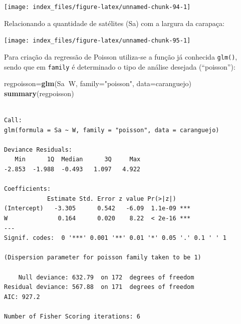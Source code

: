 \documentclass[12pt,brazil,oneside]{book}
\newenvironment{Shaded}{\begin{snugshade}}{\end{snugshade}}
\newcommand{\DataTypeTok}[1]{\textcolor[rgb]{0.13,0.29,0.53}{#1}}
\newcommand{\KeywordTok}[1]{\textcolor[rgb]{0.13,0.29,0.53}{\textbf{#1}}}
\newcommand{\NormalTok}[1]{#1}
\newcommand{\OperatorTok}[1]{\textcolor[rgb]{0.81,0.36,0.00}{\textbf{#1}}}
\newcommand{\StringTok}[1]{\textcolor[rgb]{0.31,0.60,0.02}{#1}}
\begin{document}
\begin{center}\texttt{[image: index\_files/figure-latex/unnamed-chunk-94-1]} \end{center}

Relacionando a quantidade de satélites (Sa) com a largura da carapaça:

\begin{Shaded}
\end{Shaded}

\begin{center}\texttt{[image: index\_files/figure-latex/unnamed-chunk-95-1]} \end{center}

Para criação da regressão de Poisson utiliza-se a função já conhecida \texttt{glm()}, sendo que em \texttt{family} é determinado o tipo de análise desejada (``poisson''):

\begin{Shaded}
\begin{Highlighting}[]
\NormalTok{regpoisson=}\KeywordTok{glm}\NormalTok{(Sa}\OperatorTok{~}\NormalTok{W, }\DataTypeTok{family=}\StringTok{"poisson"}\NormalTok{, }\DataTypeTok{data=}\NormalTok{caranguejo)}
\KeywordTok{summary}\NormalTok{(regpoisson)}
\end{Highlighting}
\end{Shaded}

\begin{verbatim}

Call:
glm(formula = Sa ~ W, family = "poisson", data = caranguejo)

Deviance Residuals: 
   Min      1Q  Median      3Q     Max  
-2.853  -1.988  -0.493   1.097   4.922  

Coefficients:
            Estimate Std. Error z value Pr(>|z|)    
(Intercept)   -3.305      0.542   -6.09  1.1e-09 ***
W              0.164      0.020    8.22  < 2e-16 ***
---
Signif. codes:  0 '***' 0.001 '**' 0.01 '*' 0.05 '.' 0.1 ' ' 1

(Dispersion parameter for poisson family taken to be 1)

    Null deviance: 632.79  on 172  degrees of freedom
Residual deviance: 567.88  on 171  degrees of freedom
AIC: 927.2

Number of Fisher Scoring iterations: 6
\end{verbatim}
\end{document}

